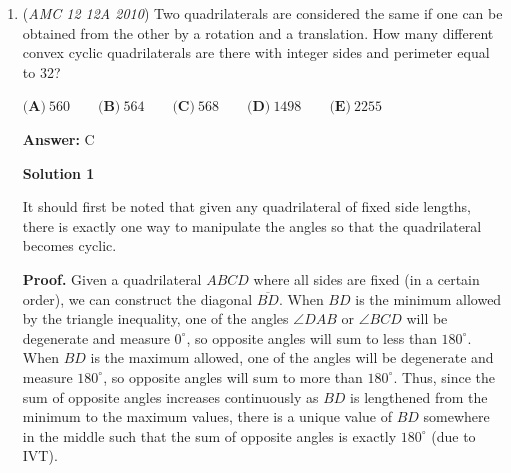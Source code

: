 \begin{enumerate}
 
$1$: n/a

 
$2: \frac{1}{2}$
$3: \frac{1}{3}, \frac{2}{3}$
$4: \frac{1}{4}, \frac{2}{4}, \frac{3}{4}$
$5: \frac{1}{5}, \frac{2}{5}, \frac{3}{5}, \frac{4}{5}$
$6: \frac{1}{6}, \frac{2}{6}, \frac{3}{6}, \frac{4}{6}, \frac{5}{6}$
$7: \frac{1}{7}, \frac{2}{7}, \frac{3}{7}, \frac{4}{7}, \frac{5}{7}, \frac{6}{7}$
$8: \frac{1}{8}, \frac{2}{8}, \frac{3}{8}, \frac{4}{8}, \frac{5}{8}, \frac{6}{8}, \frac{7}{8}$

 
Then in order (showing duplicates as well):

 
$\frac{1}{8}, \frac{1}{7}, \frac{1}{6}, \frac{1}{5}, \frac{1}{4}, \frac{1}{4}, \frac{2}{7}, \frac{1}{3}, \frac{1}{3}, \frac{3}{8}, \frac{2}{5}, \frac{3}{7}, \frac{1}{2}, \frac{1}{2}, \frac{1}{2}, \frac{1}{2}, \frac{4}{7}, \frac{3}{5}, \frac{5}{8}, \frac{2}{3}, \frac{2}{3}, \frac{5}{7}, \frac{3}{4}, \frac{3}{4}, \frac{4}{5}, \frac{5}{6}, \frac{6}{7}, \frac{7}{8}$

 
Then creating a sequence of signs based on the roots:

 
$+,-,+,-,+,+,-,-,+,-,+,+,-,+,-,-,+,+,-,+,-,+$

 
We see that there are $12$ positive intervals $\Rightarrow \boxed{\text{B}}$.

 \textbf{Graph} \href{https://www.desmos.com/calculator/fahoyoijac}{https://www.desmos.com/calculator/fahoyoijac}

 


	\item (\textit{AMC 12 12A 2010}) Two quadrilaterals are considered the same if one can be obtained from the other by a rotation and a translation. How many different convex cyclic quadrilaterals are there with integer sides and perimeter equal to 32?


 $\textbf{(A)}\ 560 \qquad \textbf{(B)}\ 564 \qquad \textbf{(C)}\ 568 \qquad \textbf{(D)}\ 1498 \qquad \textbf{(E)}\ 2255$

 \textbf{Answer: }C



\textbf{Solution 1}

It should first be noted that given any quadrilateral of fixed side lengths, there is exactly one way to manipulate the angles so that the quadrilateral becomes cyclic.

 \textbf{Proof.} Given a quadrilateral $ABCD$ where all sides are fixed (in a certain order), we can construct the diagonal $\overline{BD}$. When $BD$ is the minimum allowed by the triangle inequality, one of the angles $\angle DAB$ or $\angle BCD$ will be degenerate and measure $0^\circ$, so opposite angles will sum to less than $180^\circ$. When $BD$ is the maximum allowed, one of the angles will be degenerate and measure $180^\circ$, so opposite angles will sum to more than $180^\circ$. Thus, since the sum of opposite angles increases continuously as $BD$ is lengthened from the minimum to the maximum values, there is a unique value of $BD$ somewhere in the middle such that the sum of opposite angles is exactly $180^\circ$ (due to IVT).


\end{enumerate}
